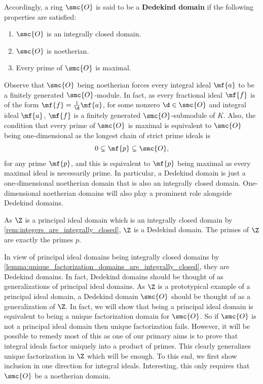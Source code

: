     Accordingly, a ring \(\smc{O}\) is said to be a \textbf{Dedekind domain} if the following properties are satisfied:
    \begin{enumerate}[label*=(\roman*)]
      \item \(\smc{O}\) is an integrally closed domain.
      \item \(\smc{O}\) is noetherian.
      \item Every prime of \(\smc{O}\) is maximal.
    \end{enumerate}
    Observe that \(\smc{O}\) being noetherian forces every integral ideal \(\mf{a}\) to be a finitely generated \(\smc{O}\)-module. In fact, as every fractional ideal \(\mf{f}\) is of the form \(\mf{f} = \frac{1}{\d}\mf{a}\), for some nonzero \(\d \in \smc{O}\) and integral ideal \(\mf{a}\), \(\mf{f}\) is a finitely generated \(\smc{O}\)-submodule of \(K\). Also, the condition that every prime of \(\smc{O}\) is maximal is equivalent to \(\smc{O}\) being one-dimensional as the longest chain of strict prime ideals is
    \[
      0 \subsetneq \mf{p} \subsetneq \smc{O},
    \]
    for any prime \(\mf{p}\), and this is equivalent to \(\mf{p}\) being maximal as every maximal ideal is necessarily prime. In particular, a Dedekind domain is just a one-dimensional noetherian domain that is also an integrally closed domain. One-dimensional noetherian domains will also play a prominent role alongside Dedekind domains.

    \begin{remark}
      As \(\Z\) is a principal ideal domain which is an integrally closed domain by \cref{rem:integers_are_integrally_closed}, \(\Z\) is a Dedekind domain. The primes of \(\Z\) are exactly the primes \(p\).
    \end{remark}
    
    In view of principal ideal domains being integrally closed domains by \cref{lemma:unique_factorization_domains_are_integrally_closed}, they are Dedekind domains. In fact, Dedekind domains should be thought of as generalizations of principal ideal domains. As \(\Z\) is a prototypical example of a principal ideal domain, a Dedekind domain \(\smc{O}\) should be thought of as a generalization of \(\Z\). In fact, we will show that being a principal ideal domain is equivalent to being a unique factorization domain for \(\smc{O}\). So if \(\smc{O}\) is not a principal ideal domain then unique factorization fails. However, it will be possible to remedy most of this as one of our primary aims is to prove that integral ideals factor uniquely into a product of primes. This clearly generalizes unique factorization in \(\Z\) which will be enough. To this end, we first show inclusion in one direction for integral ideals. Interesting, this only requires that \(\smc{O}\) be a noetherian domain.

